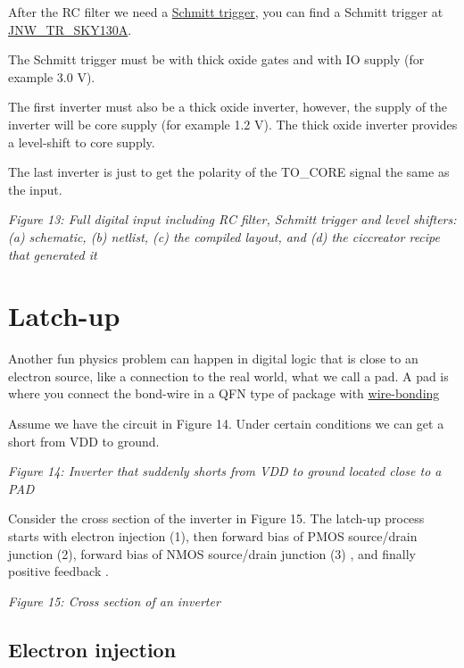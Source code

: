 After the RC filter we need a
\href{https://en.wikipedia.org/wiki/Schmitt_trigger}{Schmitt trigger},
you can find a Schmitt trigger at
\href{https://analogicus.github.io/jnw_tr_sky130A/schematic.html}{JNW\_TR\_SKY130A}.

The Schmitt trigger must be with thick oxide gates and with IO supply
(for example 3.0 V).

The first inverter must also be a thick oxide inverter, however, the
supply of the inverter will be core supply (for example 1.2 V). The
thick oxide inverter provides a level-shift to core supply.

The last inverter is just to get the polarity of the TO\_CORE signal the
same as the input.


{
\centering
{}
}

\emph{Figure 13: Full digital input including RC filter, Schmitt trigger
and level shifters: (a) schematic, (b) netlist, (c) the compiled layout,
and (d) the ciccreator recipe that generated it}

\section{Latch-up}\label{latch-up}

Another fun physics problem can happen in digital logic that is close to
an electron source, like a connection to the real world, what we call a
pad. A pad is where you connect the bond-wire in a QFN type of package
with \href{https://en.wikipedia.org/wiki/Wire_bonding}{wire-bonding}

Assume we have the circuit in Figure 14. Under certain conditions we can
get a short from VDD to ground.


{
\centering
{}
}

\emph{Figure 14: Inverter that suddenly shorts from VDD to ground
located close to a PAD}

Consider the cross section of the inverter in Figure 15. The latch-up
process starts with electron injection (1), then forward bias of PMOS
source/drain junction (2), forward bias of NMOS source/drain junction
(3) , and finally positive feedback .


{
\centering
{}
}

\emph{Figure 15: Cross section of an inverter }

\subsection{Electron injection}\label{electron-injection}

